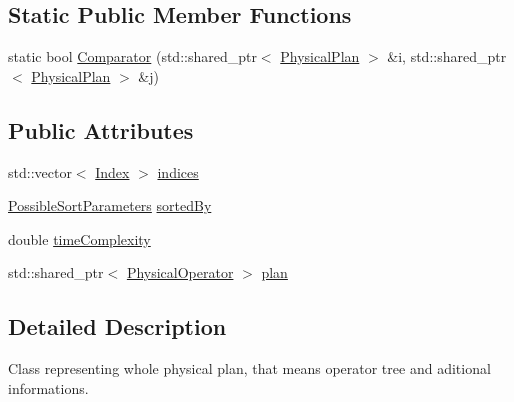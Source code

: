 \subsection*{Static Public Member Functions}
\begin{DoxyCompactItemize}
\item 
static bool \hyperlink{classrafe_1_1_physical_plan_acde8212fd29787b0fef4db7a080f70d3}{Comparator} (std\+::shared\+\_\+ptr$<$ \hyperlink{classrafe_1_1_physical_plan}{Physical\+Plan} $>$ \&i, std\+::shared\+\_\+ptr$<$ \hyperlink{classrafe_1_1_physical_plan}{Physical\+Plan} $>$ \&j)
\end{DoxyCompactItemize}
\subsection*{Public Attributes}
\begin{DoxyCompactItemize}
\item 
std\+::vector$<$ \hyperlink{classrafe_1_1_index}{Index} $>$ \hyperlink{classrafe_1_1_physical_plan_a612093270ee90c36a303533cf3ea4f48}{indices}
\item 
\hyperlink{classrafe_1_1_possible_sort_parameters}{Possible\+Sort\+Parameters} \hyperlink{classrafe_1_1_physical_plan_ada9f8409dc126ccc378c91a507e83854}{sorted\+By}
\item 
double \hyperlink{classrafe_1_1_physical_plan_a1f5748b98d9ae211fc653ad0de0fe2a2}{time\+Complexity}
\item 
std\+::shared\+\_\+ptr$<$ \hyperlink{classrafe_1_1_physical_operator}{Physical\+Operator} $>$ \hyperlink{classrafe_1_1_physical_plan_ac90f368fe33c419642571aa4573856c1}{plan}
\end{DoxyCompactItemize}


\subsection{Detailed Description}
Class representing whole physical plan, that means operator tree and aditional informations. 

